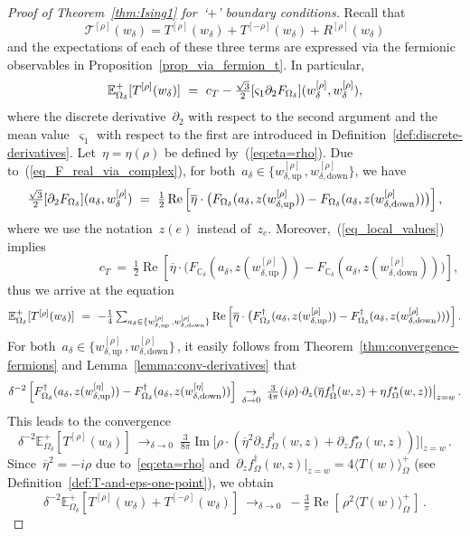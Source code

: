 \documentclass[reqno,11pt,a4paper]{amsart}
\theoremstyle{remark}
\newcommand{\C}{\mathbb{C}}
\newcommand{\CmT}{c_T}
\newcommand{\Trho}{T^{[\rho]}}
\newcommand{\Rrho}{R^{[\rho]}}
\newcommand{\Tmrho}{T^{\left[-\rho \right]}}
\newcommand{\Edelta}{\mathbb{E}_{\Omega_\delta}}
\newcommand{\weta}{w^{\left[\eta \right]}}
\newcommand{\wrho}{w^{\left[\rho \right]}}
\newcommand{\fstar}{f_{\Omega}^\star}
\newcommand{\freg}{f_{\Omega}^\dag}
\newcommand{\dTwo}{\partial_2}
\newcommand{\sOne}{\varsigma_1}
\renewcommand\Re{\operatorname{Re}}
\renewcommand\Im{\operatorname{Im}}
\newcommand\Corr[1]{\langle #1 \rangle}
\newcommand\CorrO[2][+]{\Corr{#2}_\Omega^{#1}}
\begin{document}
\begin{proof}[Proof of Theorem~\ref{thm:Ising1} for~`$+$' boundary conditions] Recall that
\[
\mathcal{T}^{[\rho]}(w_\delta)=\Trho(w_\delta)+\Tmrho(w_\delta)+\Rrho(w_\delta)
\]
and the expectations of each of these three terms are expressed via the fermionic observables in Proposition~\ref{prop_via_fermion_t}. In particular,
\[
\Edelta^+[\Trho(w_\delta)] \ =\ \CmT-{\textstyle\frac{\sqrt{3}}{2}}[\sOne\dTwo \Fdelta](\wrho_\delta,\wrho_\delta),
\]
where the discrete derivative~$\dTwo$ with respect to the second argument and the mean value~$\sOne$ with respect to the first are introduced in Definition~\ref{def:discrete-derivatives}.
Let~$\eta=\eta(\rho)$ be defined by~(\ref{eq:eta=rho}).
Due to~(\ref{eq_F_real_via_complex}), for both~$a_\delta\in\{\wrho_{\delta,\mathrm{up}}\,,\wrho_{\delta,\mathrm{down}}\}$, we have
\[
\tfrac{\sqrt{3}}{2}[\dTwo\Fdelta](a_\delta,\wrho_\delta)~=~ {\tfrac{1}{2}\Re}\left[\overline{\eta}\cdot\big(\Fdelta(a_\delta,z(\wrho_{\delta,\mathrm{up}}))- \Fdelta(a_\delta,z(\wrho_{\delta,\mathrm{down}}))\big)\right],
\]
where we use the notation~$z(e)$ instead of~$z_e$.
Moreover,~(\ref{eq_local_values}) implies
\[
\qquad \qquad \qquad\quad \CmT~=~\tfrac{1}{2}\Re\left[\overline{\eta}\cdot\big( F_{\C_\delta}(a_\delta,z(\wrho_{\delta,\mathrm{up}}))-F_{\C_\delta}(a_\delta,z(\wrho_{\delta,\mathrm{down}}))\big)\right],
\]
thus we arrive at the equation
\[
\textstyle \Edelta^+[\Trho(w_\delta)] \ =\ -{\frac{1}{4}}\sum\nolimits_{a_\delta\in\{\wrho_{\delta,\mathrm{up}}\,,\wrho_{\delta,\mathrm{down}}\}} \Re\left[\overline{\eta}\cdot\big(\Fdelta^\dag(a_\delta,z(\wrho_{\delta,\mathrm{up}}))- \Fdelta^\dag(a_\delta,z(\wrho_{\delta,\mathrm{down}}))\big)\right].
\]
For both~$a_\delta\in\{\wrho_{\delta,\mathrm{up}}\,,\wrho_{\delta,\mathrm{down}}\}$\,, it easily follows from Theorem~\ref{thm:convergence-fermions} and Lemma~\ref{lemma:conv-derivatives} that
\[
\delta^{-2}\left[\Fdelta^\dag(a_\delta,z(\weta_{\delta,\mathrm{up}}))- \Fdelta^\dag(a_\delta,z(\weta_{\delta,\mathrm{down}}))\right] \ \mathop{\to}_{\delta\to 0}\ {\tfrac{3}{4\pi}(i\rho)\cdot}\partial_{z}(\overline{\eta}\freg(w,z)+\eta\fstar(w,z))\big|_{z=w}\,.
\]
This leads to the convergence
\[
\delta^{-2}\Edelta^+[\Trho(w_\delta)]~\mathop{\to}_{\delta\to 0}~ {\tfrac{3}{8\pi}\Im\big[\rho}\cdot(\overline{\eta}^2\partial_z\freg(w,z)+\partial_z\fstar(w,z))\big]\big|_{z=w}\,.
\]
Since~$\overline{\eta}^2=-i\rho$ due to~\eqref{eq:eta=rho} and~$\partial_z\freg(w,z)\big|_{z=w}=4\CorrO{T(w)}$ (see Definition~\ref{def:T-and-eps-one-point}), we obtain
\begin{equation}\label{eq_TetaTieta_conv}
\delta^{-2}\Edelta^+[\Trho(w_\delta)+\Tmrho(w_\delta)]\ \mathop{\to}_{\delta\to 0}\  %
-\tfrac{3}{\pi}\Re[\,{\rho^2}\CorrO{T(w)}\,]\,.
\end{equation}


\end{proof}
\end{document}
